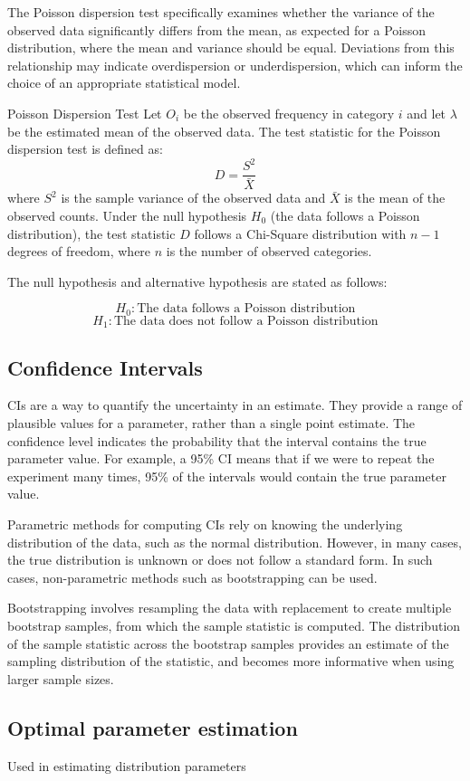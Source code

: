 The Poisson dispersion test specifically examines whether the variance of the observed data significantly differs from the mean, as expected for a Poisson distribution, where the mean and variance should be equal. Deviations from this relationship may indicate overdispersion or underdispersion, which can inform the choice of an appropriate statistical model.
\begin{note}
    {Poisson Dispersion Test}
    Let $O_i$ be the observed frequency in category $i$ and let $\lambda$ be the estimated mean of the observed data. The test statistic for the Poisson dispersion test is defined as:
    \begin{equation}
    D = \frac{S^2}{\bar{X}}
    \end{equation}
    where $S^2$ is the sample variance of the observed data and $\bar{X}$ is the mean of the observed counts.
    Under the null hypothesis $H_0$ (the data follows a Poisson distribution), the test statistic $D$ follows a Chi-Square distribution with $n - 1$ degrees of freedom, where $n$ is the number of observed categories. 

The null hypothesis and alternative hypothesis are stated as follows:

\begin{equation*}
    H_0: \text{The data follows a Poisson distribution}
\end{equation*}
\begin{equation*}
    H_1: \text{The data does not follow a Poisson distribution}
\end{equation*}
\end{note}


\subsection*{Confidence Intervals}
\Glspl{CI} are a way to quantify the uncertainty in an estimate. They provide a range of plausible values for a parameter, rather than a single point estimate. The confidence level indicates the probability that the interval contains the true parameter value. For example, a 95\% \gls{CI} means that if we were to repeat the experiment many times, 95\% of the intervals would contain the true parameter value.

Parametric methods for computing \glspl{CI} rely on knowing the underlying distribution of the data, such as the normal distribution. However, in many cases, the true distribution is unknown or does not follow a standard form. In such cases, non-parametric methods such as bootstrapping can be used.

Bootstrapping involves resampling the data with replacement to create multiple bootstrap samples, from which the sample statistic is computed. The distribution of the sample statistic across the bootstrap samples provides an estimate of the sampling distribution of the statistic, and becomes more informative when using larger sample sizes.

\subsection*{Optimal parameter estimation}
Used in estimating distribution parameters